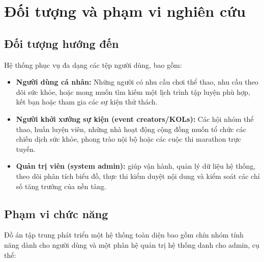\section{Đối tượng và phạm vi nghiên cứu}
\label{sec:intro:scope}

\subsection{Đối tượng hướng đến}
\label{subsec:intro:target_audience}

Hệ thống phục vụ đa dạng các tệp người dùng, bao gồm:

\begin{itemize}
    \item \textbf{Người dùng cá nhân:} Những người có nhu cầu chơi thể thao, nhu cầu theo dõi sức khỏe, hoặc mong muốn tìm kiếm một lịch trình tập luyện phù hợp, kết bạn hoặc tham gia các sự kiện thử thách.
    \item \textbf{Người khởi xướng sự kiện (event creators/KOLs):} Các hội nhóm thể thao, huấn luyện viên, những nhà hoạt động cộng đồng muốn tổ chức các chiến dịch sức khỏe, phong trào nội bộ hoặc các cuộc thi marathon trực tuyến.
    \item \textbf{Quản trị viên (system admin):} giúp vận hành, quản lý dữ liệu hệ thống, theo dõi phân tích biểu đồ, thực thi kiểm duyệt nội dung và kiểm soát các chỉ số tăng trưởng của nền tảng.
\end{itemize}

\subsection{Phạm vi chức năng}
\label{subsec:intro:functional_scope}

Đồ án tập trung phát triển một hệ thống toàn diện bao gồm chín nhóm tính năng dành cho người dùng và một phân hệ quản trị hệ thống danh cho admin, cụ thể:

